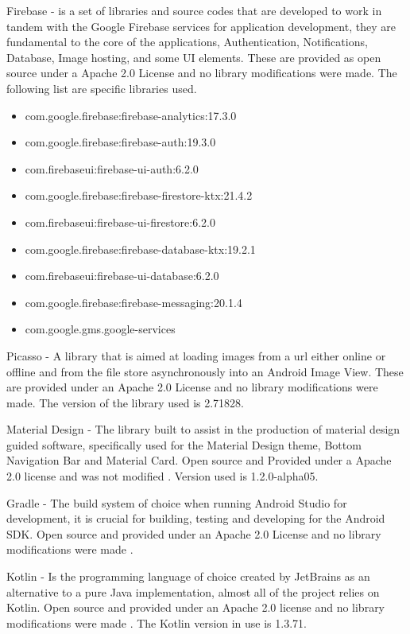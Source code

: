 Firebase - is a set of libraries and source codes that are developed to work in tandem with the Google Firebase services for application development, they are fundamental to the core of the applications, Authentication, Notifications, Database, Image hosting, and some UI elements. These are provided as open source under a Apache 2.0 License and no library modifications were made. \cite{APACHE2LICENSE} The following list are specific libraries used.
    \begin{itemize}
        \item com.google.firebase:firebase-analytics:17.3.0
        \item com.google.firebase:firebase-auth:19.3.0
        \item com.firebaseui:firebase-ui-auth:6.2.0
        \item com.google.firebase:firebase-firestore-ktx:21.4.2
        \item com.firebaseui:firebase-ui-firestore:6.2.0
        \item com.google.firebase:firebase-database-ktx:19.2.1
        \item com.firebaseui:firebase-ui-database:6.2.0
        \item com.google.firebase:firebase-messaging:20.1.4
        \item com.google.gms.google-services
    \end{itemize}
    
Picasso - A library that is aimed at loading images from a url either online or offline and from the file store asynchronously into an Android Image View. These are provided under an Apache 2.0 License and no library modifications were made. \cite{APACHE2LICENSE} The version of the library used is 2.71828. 

Material Design - The library built to assist in the production of material design guided software, specifically used for the Material Design theme, \gls{Bottom Navigation Bar} and Material \gls{Card}. Open source and Provided under a Apache 2.0 license and was not modified \cite{APACHE2LICENSE}. Version used is 1.2.0-alpha05.

Gradle - The build system of choice when running Android Studio for development, it is crucial for building, testing and developing for the Android SDK. Open source and provided under an Apache 2.0 License and no library modifications were made \cite{APACHE2LICENSE}.

Kotlin - Is the programming language of choice created by JetBrains as an alternative to a pure Java implementation, almost all of the project relies on Kotlin. Open source and provided under an Apache 2.0 license and no library modifications were made \cite{APACHE2LICENSE}. The Kotlin version in use is 1.3.71.